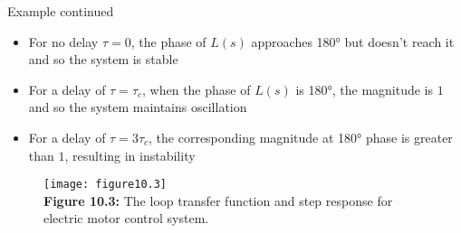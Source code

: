 \documentclass{beamer-control}
\begin{document}
\begin{frame}{Example continued}
\begin{itemize}
\item For no delay $\tau=0$, the phase of $L(s)$ approaches \ang{180} but doesn't reach it and so the system is stable
\item For a delay of $\tau=\tau_c$, when the phase of $L(s)$ is \ang{180}, the magnitude is $1$ and so the system maintains oscillation
\item For a delay of $\tau=3\tau_c$, the corresponding magnitude at \ang{180} phase is greater than $1$, resulting in instability
\end{itemize}
\begin{figure}
\centering
\texttt{[image: figure10.3]}
\\
\textbf{Figure 10.3:} The loop transfer function and step response for electric motor control system.
\end{figure}

\end{frame}


\SUMMARYFRAME
\FINALE
\end{document}
